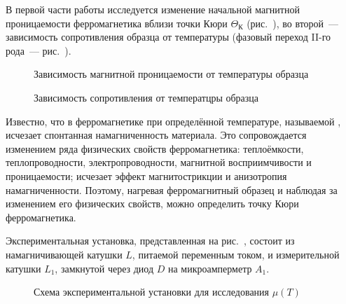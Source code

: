 






В первой части работы исследуется изменение начальной магнитной проницаемости
ферромагнетика вблизи точки Кюри $\Theta_{К}$ (рис.~), во второй~--- зависимость сопротивления образца
от температуры (фазовый переход II-го рода~--- рис.~).

\begin{figure}[h!]
    \hfil
\parbox{5cm}{%
	\begin{minipage}[b]{5cm}
		\caption{Зависимость магнитной проницаемости от температуры образца}
	\end{minipage}%
}
	\hfil
\parbox{5cm}{%
	\begin{minipage}[b]{5cm}
		\caption{Зависимость сопротивления от температцры образца}
	\end{minipage}%
}
\end{figure}


Известно, что в ферромагнетике при определённой температуре, называемой
, исчезает спонтанная намагниченность материала. Это
сопровождается изменением ряда физических свойств ферромагнетика: теплоёмкости,
теплопроводности, электропроводности, магнитной восприимчивости и
проницаемости; исчезает эффект магнитострикции и анизотропия намагниченности.
Поэтому, нагревая ферромагнитный образец и наблюдая за изменением его физических
свойств, можно определить точку Кюри ферромагнетика.


\experiment
Экспериментальная установка, представленная на рис.~, состоит из намагничивающей катушки $L$,
питаемой переменным током, и измерительной катушки $L_1$, замкнутой через диод
$D$ на микроамперметр $A_1$.

\begin{figure}[h!]
\centering
	\caption{Схема экспериментальной установки для исследования $\mu(T)$}
\end{figure}


